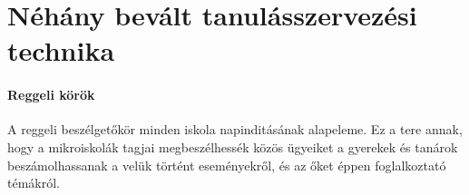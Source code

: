 \section{Néhány bevált tanulásszervezési technika}
\paragraph{Reggeli körök}
A reggeli
beszélgetőkör minden iskola napinditásának alapeleme. Ez a tere annak,
hogy a mikroiskolák tagjai megbeszélhessék közös ügyeiket a gyerekek és tanárok
beszámolhassanak a velük történt eseményekről, és az őket éppen foglalkoztató
témákról.
